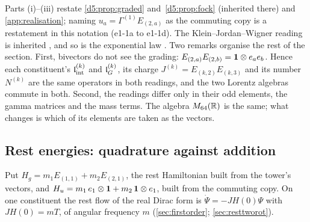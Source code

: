 Parts (i)--(iii) restate \cref{d5:prop:graded} and~\cref{d5:prop:fock} (inherited there) and \cref{app:realisation}; naming
$u_a=\Gamma^{(1)}E_{(2,a)}$ as the commuting copy is a restatement in this notation (e1-1a to e1-1d). The
Klein--Jordan--Wigner reading is inherited \cite{JordanWigner28,Klein38}, and so is the exponential law \cite{Chevalley54,LawsonMichelsohn89}. Two
remarks organise the rest of the section. First, bivectors do not see the grading: $E_{(2,a)}E_{(2,b)}=\mathbf 1\otimes e_ae_b$. Hence each
constituent's $\mathfrak l_{\rm int}^{(k)}$ and $\mathfrak l_G^{(k)}$, its charge $J^{(k)}=E_{(k,2)}E_{(k,3)}$ and its number $N^{(k)}$ are the same operators in both
readings, and the two Lorentz algebras commute in both. Second, the readings differ only in their odd elements, the gamma matrices and
the mass terms. The algebra $M_{64}(\mathbb{R})$ is the same; what changes is which of its elements are taken as the vectors.

\subsection{Rest energies: quadrature against addition}
\label{e1:sec:rest}

Put $H_g=m_1E_{(1,1)}+m_2E_{(2,1)}$, the rest Hamiltonian built from the tower's vectors, and $H_u=m_1\,e_1\otimes\mathbf 1+m_2\,\mathbf 1\otimes e_1$,
built from the commuting copy. On one constituent the rest flow of the real Dirac form is $\dot\Psi=-JH(0)\Psi$ with $JH(0)=mT$, of angular
frequency $m$ (\cref{sec:firstorder}; \cref{sec:resttworot}).

